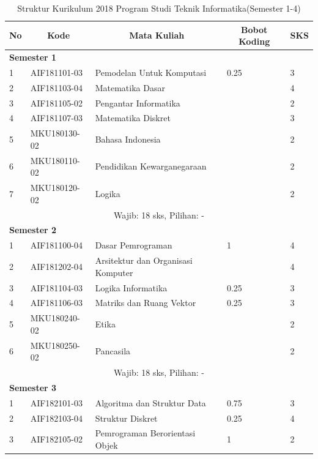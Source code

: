 \begin{table}[H]
	\centering
		\caption{Struktur Kurikulum 2018 Program Studi Teknik Informatika(Semester 1-4)}
		\begin{tabular}{|p{0.5cm}|p{2.85cm}|p{4.95cm}|p{2.7cm}|p{2.7cm}|}
			\hline
			\multicolumn{1}{|c|}{\textbf{No}} & \multicolumn{1}{c|}{\textbf{Kode}} & \multicolumn{1}{c|}{\textbf{Mata Kuliah}} & \multicolumn{1}{c|}{\textbf{Bobot Koding}} & \multicolumn{1}{c|}{\textbf{SKS}} \\ \hline
			\multicolumn{5}{|l|}{\textbf{Semester 1}} \\ \hline
			1 &	AIF181101-03 &	Pemodelan Untuk Komputasi &	0.25 &	3   \\ \hline
			2 &	AIF181103-04 &	Matematika Dasar &	&	4  \\ \hline
			3 &	AIF181105-02 &	Pengantar Informatika &  & 2  \\ \hline
			4	& AIF181107-03 &	Matematika Diskret &	&	3  \\ \hline
			5	& MKU180130-02 &	Bahasa Indonesia &	&	2  \\ \hline
			6	& MKU180110-02 &	Pendidikan Kewarganegaraan &	&	2  \\ \hline
			7	& MKU180120-02 &	Logika &	&	2  \\ \hline
			\multicolumn{5}{|c|}{Wajib: 18 sks, Pilihan: -} \\ \hline
			\multicolumn{5}{|l|}{\textbf{Semester 2}} \\ \hline
			1 &	AIF181100-04 &	Dasar Pemrograman &	1 &	4 \\ \hline
			2 &	AIF181202-04 &	Arsitektur dan Organisasi Komputer & &	4  \\ \hline
			3 &	AIF181104-03 &	Logika Informatika &	0.25 &	3  \\ \hline
			4 &	AIF181106-03 &	Matriks dan Ruang Vektor &	0.25 &	3  \\ \hline
			5 &	MKU180240-02 &	Etika	& &	2  \\ \hline
			6 &	MKU180250-02 &	Pancasila & &	2  \\ \hline
			\multicolumn{5}{|c|}{Wajib: 18 sks, Pilihan: - }\\ \hline
			\multicolumn{5}{|l|}{\textbf{Semester 3}} \\ \hline
			1 &	AIF182101-03 &	Algoritma dan Struktur Data &	0.75 &	3  \\ \hline
			2 &	AIF182103-04 &	Struktur Diskret &	0.25 &	4  \\ \hline
			3 &	AIF182105-02 &	Pemrograman Berorientasi Objek &	1 &	2   \\ \hline

\end{tabular}
\end{table}
